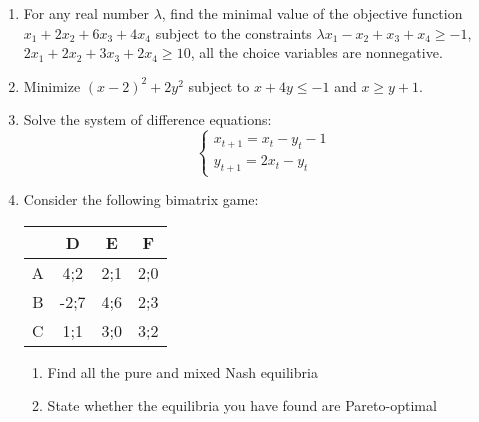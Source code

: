 \documentclass[12pt,a4paper]{article}
\begin{document}
\begin{enumerate}

\item For any real number $\lambda$, find the minimal value of the objective function $x_1+2x_2+6x_3+4x_4$ subject to the constraints  $\lambda x_1-x_2+x_3+x_4\geq -1$, $2x_1+2x_2+3x_3+2x_4 \geq 10$,  all the choice variables are nonnegative.


\item Minimize $(x-2)^2+2 y^2$ subject to $x+4y\leq -1$ and $x\geq y+1$.



\item Solve the system of difference equations:
\[
\begin{cases}
x_{t+1}=x_t-y_t - 1\\
y_{t+1}=2x_t-y_t
\end{cases}
\]

\item   Consider the following bimatrix game:


\begin{tabular}{c|ccc}
 & D & E & F \\
\hline
A & 4;2 & 2;1 & 2;0  \\
B & -2;7 & 4;6 & 2;3  \\
C & 1;1 & 3;0 & 3;2  \\
\end{tabular}

\begin{enumerate}
\item Find all the pure and mixed Nash equilibria
\item State whether the equilibria you have found are Pareto-optimal
\end{enumerate}

\end{enumerate}
\end{document}
